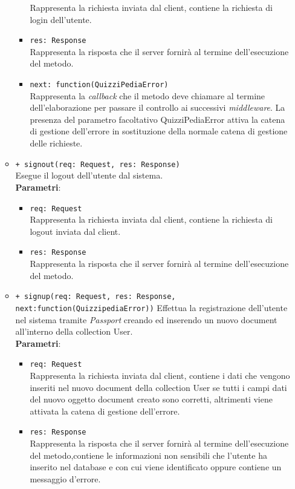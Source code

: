 \begin{itemize}
\begin{itemize}
\begin{itemize}
			Rappresenta la richiesta inviata dal client, contiene la richiesta di login dell’utente.
		  \item
			\texttt{res: Response} \\
			Rappresenta la risposta che il server fornirà al termine dell'esecuzione del metodo.
		  \item
		    \texttt{next: function(QuizziPediaError)} \\
			Rappresenta la \textit{callback} che il metodo deve chiamare al termine dell'elaborazione per passare il controllo ai successivi \textit{middleware}. La presenza del parametro facoltativo QuizziPediaError attiva la catena di gestione dell'errore in sostituzione della normale catena di gestione delle richieste.
		 \end{itemize}
		\item
		\texttt{+ signout(req: Request, res: Response)} \\
		Esegue il logout dell’utente dal sistema.\\
		\textbf{Parametri}:
		 \begin{itemize}
		 \item
			\texttt{req: Request} \\
			Rappresenta la richiesta inviata dal client, contiene la richiesta di logout inviata dal client.
		 \item
			\texttt{res: Response} \\
			Rappresenta la risposta che il server fornirà al termine dell'esecuzione del metodo.	 
		 \end{itemize} 
		\item
		\texttt{+ signup(req: Request, res: Response, next:function(QuizzipediaError))}
		Effettua la registrazione dell’utente nel sistema tramite \textit{Passport} creando ed inserendo un nuovo document all’interno della collection User.\\
		\textbf{Parametri}:
		 \begin{itemize}
		 \item
			\texttt{req: Request} \\
			Rappresenta la richiesta inviata dal client, contiene i dati che vengono inseriti nel nuovo document della collection User se tutti i campi dati del nuovo oggetto document creato sono corretti, altrimenti viene attivata la catena di gestione dell'errore.
		 \item
			\texttt{res: Response} \\
			Rappresenta la risposta che il server fornirà al termine dell'esecuzione del metodo,contiene le informazioni non sensibili che l'utente ha inserito nel database e con cui viene identificato oppure contiene un messaggio d’errore.

\end{itemize}
\end{itemize}
\end{itemize}
